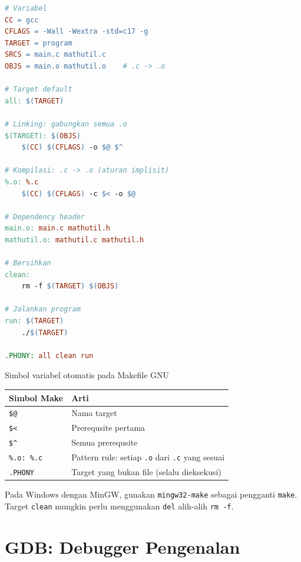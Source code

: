 \documentclass[../main.tex]{subfiles}
\begin{document}
\begin{lstlisting}[language=make,caption=Makefile dengan penjelasan]
# Variabel
CC = gcc
CFLAGS = -Wall -Wextra -std=c17 -g
TARGET = program
SRCS = main.c mathutil.c
OBJS = main.o mathutil.o    # .c -> .o

# Target default
all: $(TARGET)

# Linking: gabungkan semua .o
$(TARGET): $(OBJS)
	$(CC) $(CFLAGS) -o $@ $^

# Kompilasi: .c -> .o (aturan implisit)
%.o: %.c
	$(CC) $(CFLAGS) -c $< -o $@

# Dependency header
main.o: main.c mathutil.h
mathutil.o: mathutil.c mathutil.h

# Bersihkan
clean:
	rm -f $(TARGET) $(OBJS)

# Jalankan program
run: $(TARGET)
	./$(TARGET)

.PHONY: all clean run
\end{lstlisting}

\begin{modultable}[]{Simbol variabel otomatis pada Makefile GNU}
\begin{tabular}{|l|l|}
\hline
\textbf{Simbol Make} & \textbf{Arti} \\
\hline
\texttt{\$@} & Nama target \\
\hline
\texttt{\$<} & Prerequsite pertama \\
\hline
\texttt{\$\^{}} & Semua prerequsite \\
\hline
\texttt{\%.o: \%.c} & Pattern rule: setiap \texttt{.o} dari \texttt{.c} yang sesuai \\
\hline
\texttt{.PHONY} & Target yang bukan file (selalu dieksekusi) \\
\hline
\end{tabular}
\end{modultable}

\begin{catatan}
Pada Windows dengan MinGW, gunakan \texttt{mingw32-make} sebagai pengganti \texttt{make}. Target \texttt{clean} mungkin perlu menggunakan \texttt{del} alih-alih \texttt{rm -f}.
\end{catatan}

\section{GDB: Debugger Pengenalan}
\end{document}
